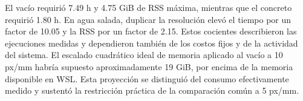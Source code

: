 El vacío requirió 7.49 h y 4.75 GiB de RSS máxima, mientras que el concreto requirió 1.80 h. En agua salada, duplicar la resolución elevó el tiempo por un factor de 10.05 y la RSS por un factor de 2.15. Estos cocientes describieron las ejecuciones medidas y dependieron también de los costos fijos y de la actividad del sistema. El escalado cuadrático ideal de memoria aplicado al vacío a 10 px/mm habría supuesto aproximadamente 19 GiB, por encima de la memoria disponible en WSL. Esta proyección se distinguió del consumo efectivamente medido y sustentó la restricción práctica de la comparación común a 5 px/mm.
